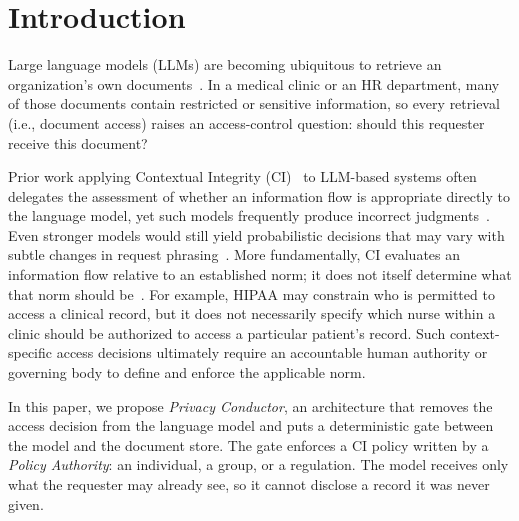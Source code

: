 \section{Introduction}
\label{sec:intro}

Large language models (LLMs) are becoming ubiquitous to retrieve an
organization's own documents~\cite{lewis2020,yao2023}. In a medical clinic or an HR
department, many of those documents contain restricted or sensitive information, so every retrieval (i.e., document access) raises an access-control question: should this requester receive this document?

Prior work applying Contextual Integrity (CI)~\cite{nissenbaum} to LLM-based systems often delegates the assessment of whether an information flow is appropriate directly to the language model, yet such models frequently produce incorrect judgments~\cite{mireshghallah2024,shao2024,privacibench}. Even stronger models would still yield probabilistic decisions that may vary with subtle changes in request phrasing~\cite{sclar2024}. More fundamentally, CI evaluates an information flow relative to an established norm; it does not itself determine what that norm should be~\cite{barth2006}. For example, HIPAA may constrain who is permitted to access a clinical record, but it does not necessarily specify which nurse within a clinic should be authorized to access a particular patient's record. Such context-specific access decisions ultimately require an accountable human authority or governing body to define and enforce the applicable norm.


In this paper, we propose \emph{Privacy Conductor}, an architecture that removes the access decision from the language model and puts a deterministic gate between the model and the document store. The gate enforces a CI policy written by a \textit{Policy Authority}: an
individual, a group, or a regulation. The model receives only what the requester may already see, so it cannot disclose a record it was never given.

